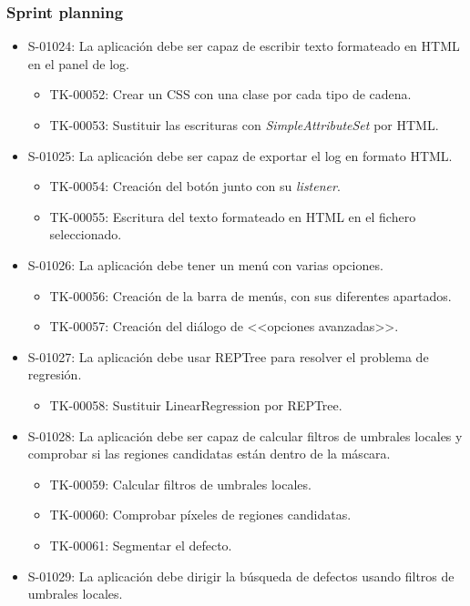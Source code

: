 \subsubsection*{Sprint planning}
\begin{itemize}
 \item S-01024: La aplicación debe ser capaz de escribir texto formateado en HTML en el panel de log.
  \begin{itemize}
   \item TK-00052: Crear un CSS con una clase por cada tipo de cadena.
   \item TK-00053: Sustituir las escrituras con \emph{SimpleAttributeSet} por HTML.
  \end{itemize}
 \item S-01025: La aplicación debe ser capaz de exportar el log en formato HTML.
  \begin{itemize}
   \item TK-00054: Creación del botón junto con su \emph{listener}.
   \item TK-00055: Escritura del texto formateado en HTML en el fichero seleccionado.
  \end{itemize}
 \item S-01026: La aplicación debe tener un menú con varias opciones.
  \begin{itemize}
   \item TK-00056: Creación de la barra de menús, con sus diferentes apartados.
   \item TK-00057: Creación del diálogo de <<opciones avanzadas>>.
  \end{itemize}
 \item S-01027: La aplicación debe usar REPTree para resolver el problema de regresión.
  \begin{itemize}
   \item TK-00058: Sustituir LinearRegression por REPTree.
  \end{itemize}
 \item S-01028: La aplicación debe ser capaz de calcular filtros de umbrales locales y comprobar si las regiones candidatas están dentro de la máscara.
  \begin{itemize}
   \item TK-00059: Calcular filtros de umbrales locales.
   \item TK-00060: Comprobar píxeles de regiones candidatas.
   \item TK-00061: Segmentar el defecto.
  \end{itemize}
 \item S-01029: La aplicación debe dirigir la búsqueda de defectos usando filtros de umbrales locales.

\end{itemize}
